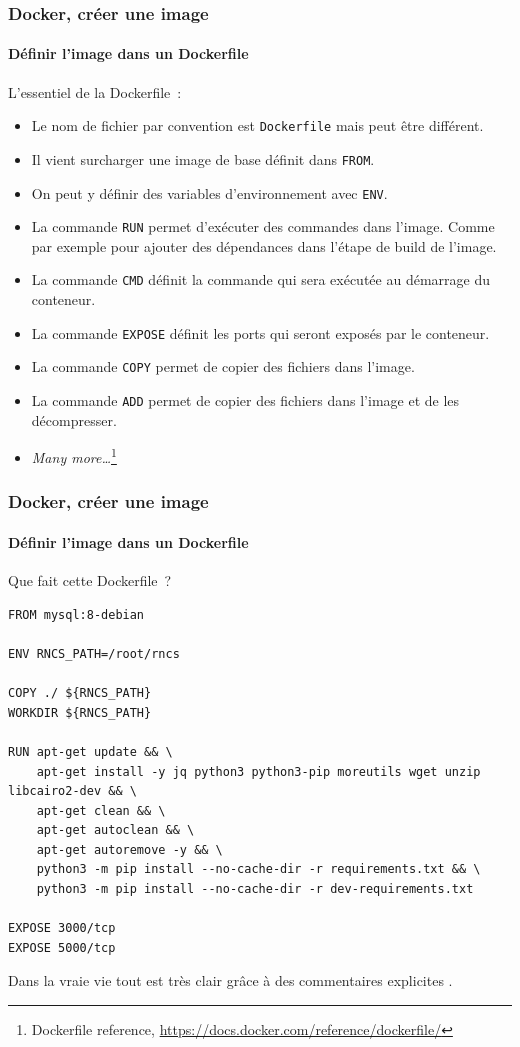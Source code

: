 \documentclass{beamer}
\begin{document}
    \begin{frame}
        \transdissolve
        \frametitle{Docker, créer une image}
        \framesubtitle{Définir l'image dans un Dockerfile}
        L'essentiel de la Dockerfile~:
        \begin{itemize}
            \item Le nom de fichier par convention est \lstinline{Dockerfile} mais peut être différent.
            \item Il vient surcharger une image de base définit dans \lstinline{FROM}.
            \item On peut y définir des variables d'environnement avec \lstinline{ENV}.
            \item La commande \lstinline{RUN} permet d'exécuter des commandes dans l'image.
            Comme par exemple pour ajouter des dépendances dans l'étape de build de l'image.
            \item La commande \lstinline{CMD} définit la commande qui sera exécutée au démarrage du conteneur.
            \item La commande \lstinline{EXPOSE} définit les ports qui seront exposés par le conteneur.
            \item La commande \lstinline{COPY} permet de copier des fichiers dans l'image.
            \item La commande \lstinline{ADD} permet de copier des fichiers dans l'image et de les décompresser.
            \item \textit{Many more\ldots}\footnote{Dockerfile reference, \url{https://docs.docker.com/reference/dockerfile/}}
        \end{itemize}

    \end{frame}

    \begin{frame}[fragile]
        \transdissolve
        \frametitle{Docker, créer une image}
        \framesubtitle{Définir l'image dans un Dockerfile}
        Que fait cette Dockerfile~?
        \begin{lstlisting}[basicstyle=\ttfamily\tiny]
FROM mysql:8-debian

ENV RNCS_PATH=/root/rncs

COPY ./ ${RNCS_PATH}
WORKDIR ${RNCS_PATH}

RUN apt-get update && \
    apt-get install -y jq python3 python3-pip moreutils wget unzip libcairo2-dev && \
    apt-get clean && \
    apt-get autoclean && \
    apt-get autoremove -y && \
    python3 -m pip install --no-cache-dir -r requirements.txt && \
    python3 -m pip install --no-cache-dir -r dev-requirements.txt

EXPOSE 3000/tcp
EXPOSE 5000/tcp
        \end{lstlisting}
        Dans la vraie vie tout est très clair grâce à des commentaires explicites .
    \end{frame}
\end{document}
